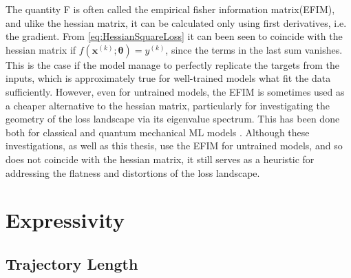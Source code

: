 The quantity F is often called the empirical fisher information matrix(EFIM)\cite{karakida2019universal}, and ulike the hessian matrix, it can be calculated only using first derivatives, i.e. the gradient.
From \autoref{eq:HessianSquareLoss} it can been seen to coincide with the hessian matrix if $f(\boldsymbol{x}^{(k)};\boldsymbol{\theta}) = y^{(k)}$, since the terms in the last sum vanishes. This is the case if the model manage to perfectly replicate the targets from the inputs, which is approximately true for well-trained models what fit the data sufficiently. However, even for untrained models, the EFIM is sometimes used as a cheaper alternative to the hessian matrix, particularly for investigating the geometry of the loss landscape via its eigenvalue spectrum. This has been done both for classical and quantum mechanical ML models \cite{karakida2019universal} \cite{abbas2020power}. Although these investigations, as well as this thesis, use the EFIM for untrained models, and so does not coincide with the hessian matrix, it still serves as a heuristic for addressing the flatness and distortions of the loss landscape. 

\section{Expressivity}\label{sec:Expressivity}


\subsection{Trajectory Length}\label{sec:TrajectoryLength}

